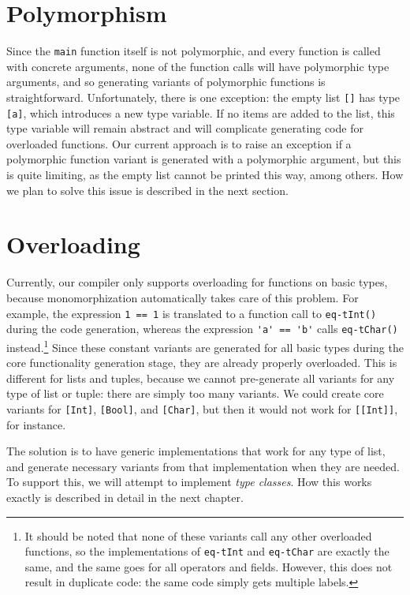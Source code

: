 \section{Polymorphism}
Since the \lstinline|main| function itself is not polymorphic, and every function is called with concrete arguments, none of the function calls will have polymorphic type arguments, and so generating variants of polymorphic functions is straightforward. Unfortunately, there is one exception: the empty list \lstinline|[]| has type \lstinline|[a]|, which introduces a new type variable. If no items are added to the list, this type variable will remain abstract and will complicate generating code for overloaded functions. Our current approach is to raise an exception if a polymorphic function variant is generated with a polymorphic argument, but this is quite limiting, as the empty list cannot be printed this way, among others. How we plan to solve this issue is described in the next section.

\section{Overloading}
Currently, our compiler only supports overloading for functions on basic types, because monomorphization automatically takes care of this problem. For example, the expression \lstinline|1 == 1| is translated to a function call to \lstinline|eq-tInt()| during the code generation, whereas the expression \lstinline|'a' == 'b'| calls \lstinline|eq-tChar()| instead.\footnote{It should be noted that none of these variants call any other overloaded functions, so the implementations of \texttt{eq-tInt} and \texttt{eq-tChar} are exactly the same, and the same goes for all operators and fields. However, this does not result in duplicate code: the same code simply gets multiple labels.}
Since these constant variants are generated for all basic types during the core functionality generation stage, they are already properly overloaded. This is different for lists and tuples, because we cannot pre-generate all variants for any type of list or tuple: there are simply too many variants. We could create core variants for \lstinline|[Int]|, \lstinline|[Bool]|, and \lstinline|[Char]|, but then it would not work for \lstinline|[[Int]]|, for instance.

The solution is to have generic implementations that work for any type of list, and generate necessary variants from that implementation when they are needed. To support this, we will attempt to implement \textit{type classes}. How this works exactly is described in detail in the next chapter.
